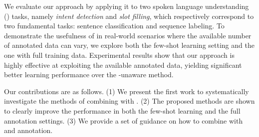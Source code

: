 %
We evaluate our approach by applying it to two spoken language understanding (\SLU) tasks, namely \emph{intent detection} and \emph{slot
filling}, which respectively correspond to two fundamental \NLP tasks: sentence classification and sequence labeling. To demonstrate the
usefulness of \REs in real-world scenarios where the available number of annotated data can vary, we explore both the few-shot learning setting and
the one with full training data. Experimental results show that our approach is highly effective at exploiting the available annotated
data, yielding significant better learning performance over the \RE-unaware method.




Our contributions are as follows. (1) We present the first work to systematically investigate the methods of combining \REs with \NNs. (2) The
proposed methods are shown to clearly improve the \NN performance in both the few-shot learning and the full annotation settings. (3) We
provide a set of guidance on how to combine \REs with \NNs and \RE annotation.
